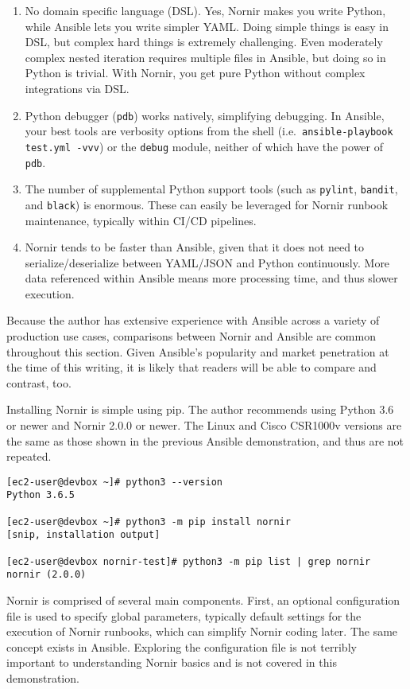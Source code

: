 \begin{enumerate}
  \item	No domain specific language (DSL). Yes, Nornir makes you write Python,
  while Ansible lets you write simpler YAML\@. Doing simple things is easy in
  DSL, but complex hard things is extremely challenging. Even moderately
  complex nested iteration requires multiple files in Ansible, but doing so in
  Python is trivial. With Nornir, you get pure Python without complex
  integrations via DSL\@.
  \item	Python debugger (\verb|pdb|) works natively, simplifying debugging. In
  Ansible, your best tools are verbosity options from the shell (i.e.\
  \verb|ansible-playbook test.yml -vvv|) or the \verb|debug| module, neither
  of which have the power of \verb|pdb|.
  \item	The number of supplemental Python support tools (such as
  \verb|pylint|, \verb|bandit|, and \verb|black|) is enormous. These can
  easily be leveraged for Nornir runbook maintenance, typically within CI/CD pipelines.
  \item	Nornir tends to be faster than Ansible, given that it does not need to
  serialize/deserialize between YAML/JSON and Python continuously. More data
  referenced within Ansible means more processing time, and thus slower execution.
\end{enumerate}

Because the author has extensive experience with Ansible across a variety of
production use cases, comparisons between Nornir and Ansible are common
throughout this section. Given Ansible's popularity and market penetration at
the time of this writing, it is likely that readers will be able to compare
and contrast, too.

Installing Nornir is simple using pip. The author recommends using Python 3.6
or newer and Nornir 2.0.0 or newer. The Linux and Cisco CSR1000v versions are
the same as those shown in the previous Ansible demonstration, and thus are not repeated.

\begin{verbatim}
[ec2-user@devbox ~]# python3 --version
Python 3.6.5

[ec2-user@devbox ~]# python3 -m pip install nornir
[snip, installation output]

[ec2-user@devbox nornir-test]# python3 -m pip list | grep nornir
nornir (2.0.0)
\end{verbatim}

Nornir is comprised of several main components. First, an optional
configuration file is used to specify global parameters, typically default
settings for the execution of Nornir runbooks, which can simplify Nornir
coding later. The same concept exists in Ansible. Exploring the configuration
file is not terribly important to understanding Nornir basics and is not
covered in this demonstration.

